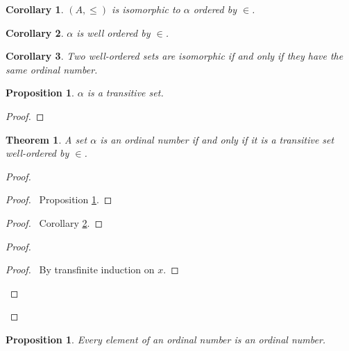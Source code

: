 \documentclass{book}
\let\qed\relax
\newtheorem{prop}[ax]{Proposition}
\newtheorem{cor}{Corollary}[ax]
\newtheorem{thm}[ax]{Theorem}
\theoremstyle{definition}
\begin{document}
\begin{cor}
\label{cor:wosetiso}
$(A, \leq)$ is isomorphic to $\alpha$ ordered by $\in$.
\end{cor}

\begin{cor}
\label{cor:ordwo}
$\alpha$ is well ordered by $\in$.
\end{cor}

\begin{cor}
Two well-ordered sets are isomorphic if and only if they have the same ordinal number.
\end{cor}

\begin{prop}
\label{prop:ordtrans}
$\alpha$ is a transitive set.
\end{prop}

\begin{proof}
\pf
{}
\qed
\end{proof}

\begin{thm}
A set $\alpha$ is an ordinal number if and only if it is a transitive set well-ordered by $\in$.
\end{thm}

\begin{proof}
\pf
{}
\begin{proof}
	\pf\ Proposition \ref{prop:ordtrans}.
\end{proof}
\begin{proof}
	\pf\ Corollary \ref{cor:ordwo}.
\end{proof}
\begin{proof}
	\begin{proof}
		\pf\ By transfinite induction on $x$.
	\end{proof}
\end{proof}
\qed
\end{proof}

\begin{prop}
Every element of an ordinal number is an ordinal number.
\end{prop}
\end{document}
